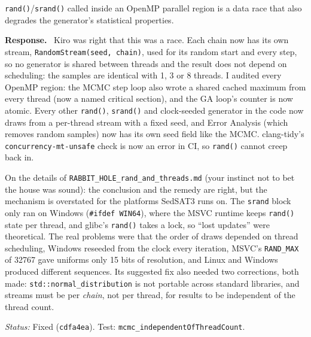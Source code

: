 \documentclass[11pt]{article}
\newcommand{\code}[1]{\texttt{#1}}
\newcommand{\commit}[1]{\texttt{#1}}
\newcounter{cmt}
\newcounter{grp}
\renewcommand{\thecmt}{\thegrp.\arabic{cmt}}
\newenvironment{reviewer}[1]{%
  \refstepcounter{cmt}%
  \begin{tcolorbox}[enhanced,breakable,colback=commentbg,colframe=usgsgreen!60,
    boxrule=0.4pt,left=6pt,right=6pt,top=4pt,bottom=4pt,
    title={\small\textbf{Comment \thecmt}\hfill\textit{#1}},
    coltitle=black,colbacktitle=usgsgreen!15,fonttitle=\small]}%
  {\end{tcolorbox}}
\newenvironment{response}{\par\noindent\textbf{Response.}\ }{\par\medskip}
\newcommand{\status}[1]{\par\noindent\textit{Status:} #1\par}
\begin{document}
\begin{reviewer}{Email 10/15, item 2; Summary; RABBIT\_HOLE\_rand\_and\_threads.md}
\code{rand()}/\code{srand()} called inside an OpenMP parallel region is a data
race that also degrades the generator's statistical properties.
\end{reviewer}
\begin{response}
Kiro was right that this was a race. Each chain now has its own stream,
\code{RandomStream(seed, chain)}, used for its random start and every step,
so no generator is shared between threads and the result does not depend
on scheduling: the samples are identical with 1, 3 or 8 threads. I audited
every OpenMP region: the MCMC step loop also wrote a shared cached maximum
from every thread (now a named critical section), and the GA loop's
counter is now atomic. Every other \code{rand()}, \code{srand()} and
clock-seeded generator in the code now draws from a per-thread stream with
a fixed seed, and Error Analysis (which removes random samples) now has its
own seed field like the MCMC. clang-tidy's \code{concurrency-mt-unsafe} check
is now an error in CI, so \code{rand()} cannot creep back in.

On the details of \code{RABBIT\_\allowbreak{}HOLE\_\allowbreak{}rand\_\allowbreak{}and\_\allowbreak{}threads.\allowbreak{}md} (your instinct
not to bet the house was sound): the conclusion and the remedy are right,
but the mechanism is overstated for the platforms SedSAT3 runs on. The
\code{srand} block only ran on Windows (\code{\#ifdef WIN64}), where the
MSVC runtime keeps \code{rand()} state per thread, and glibc's \code{rand()}
takes a lock, so ``lost updates'' were theoretical. The real problems were
that the order of draws depended on thread scheduling, Windows reseeded
from the clock every iteration, MSVC's \code{RAND\_\allowbreak{}MAX} of 32767 gave
uniforms only 15 bits of resolution, and Linux and Windows produced
different sequences. Its suggested fix also needed two corrections, both
made: \code{std::\allowbreak{}normal\_\allowbreak{}distribution} is not portable across standard
libraries, and streams must be per \emph{chain}, not per thread, for results
to be independent of the thread count.
\end{response}
\status{Fixed (\commit{cdfa4ea}). Test: \code{mcmc\_\allowbreak{}independentOfThreadCount}.}
\end{document}
